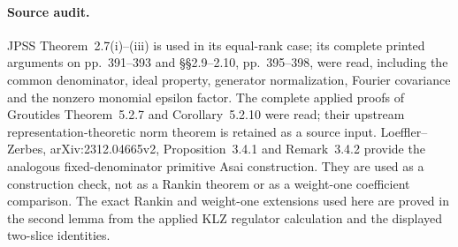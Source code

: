 \paragraph{Source audit.}
JPSS Theorem~2.7(i)--(iii) is used in its equal-rank
case; its complete printed arguments on pp.~391--393
and \S\S2.9--2.10, pp.~395--398, were read,
including the common denominator, ideal property,
generator normalization, Fourier covariance and
the nonzero monomial epsilon factor.
The complete applied proofs of Groutides
Theorem~5.2.7 and Corollary~5.2.10 were read;
their upstream representation-theoretic norm theorem
is retained as a source input.
Loeffler--Zerbes, arXiv:2312.04665v2,
Proposition~3.4.1 and Remark~3.4.2 provide the analogous
fixed-denominator primitive Asai construction.
They are used as a construction check, not as a
Rankin theorem or as a weight-one coefficient comparison.
The exact Rankin and weight-one extensions used here
are proved in the second lemma from the applied
KLZ regulator calculation and the displayed
two-slice identities.
